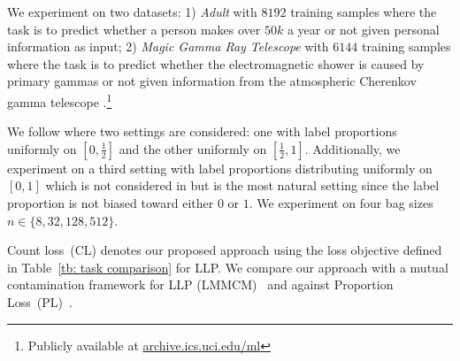 \documentclass{article}
\begin{document}
We experiment on two datasets: 
1) \emph{Adult} with $8192$ training samples where the task is to predict whether a person makes over $50k$ a year or not given personal information as input;
2) \emph{Magic Gamma Ray Telescope} with $6144$ training samples where the task is to predict whether the electromagnetic shower is caused by primary gammas or not given information from the atmospheric Cherenkov gamma telescope \citep{Dua:2019}.\footnote{Publicly available at \url{archive.ics.uci.edu/ml}}

We follow \citet{NEURIPS2020_fcde1491} 
where two settings are considered: one with label proportions uniformly on $[0, \frac{1}{2}]$ and the other uniformly on $[\frac{1}{2}, 1]$.
Additionally, we experiment on a third setting with label proportions distributing uniformly on $[0, 1]$ which is not considered in \citet{NEURIPS2020_fcde1491} but is the most natural setting since the label proportion is not biased toward either $0$ or $1$.
We experiment on four bag sizes $n \in \{8, 32, 128, 512\}$. 

Count loss~(CL) denotes our proposed approach using the loss objective defined in Table~\ref{tb: task comparison} for LLP. 
We compare our approach with a mutual contamination framework for LLP (LMMCM)~\citep{NEURIPS2020_fcde1491}
and against Proportion Loss~(PL)~\citep{tsai2020learning}.
\end{document}
